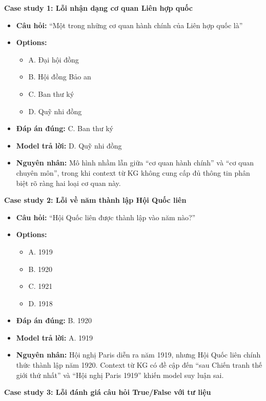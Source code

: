 \textbf{Case study 1: Lỗi nhận dạng cơ quan Liên hợp quốc}

\begin{itemize}
    \item \textbf{Câu hỏi:} ``Một trong những cơ quan hành chính của Liên hợp quốc là''
    \item \textbf{Options:} 
    \begin{itemize}
        \item A. Đại hội đồng
        \item B. Hội đồng Bảo an
        \item C. Ban thư ký
        \item D. Quỹ nhi đồng
    \end{itemize}
    \item \textbf{Đáp án đúng:} C. Ban thư ký
    \item \textbf{Model trả lời:} D. Quỹ nhi đồng
    \item \textbf{Nguyên nhân:} Mô hình nhầm lẫn giữa ``cơ quan hành chính'' và ``cơ quan chuyên môn'', trong khi context từ KG không cung cấp đủ thông tin phân biệt rõ ràng hai loại cơ quan này.
\end{itemize}

\textbf{Case study 2: Lỗi về năm thành lập Hội Quốc liên}

\begin{itemize}
    \item \textbf{Câu hỏi:} ``Hội Quốc liên được thành lập vào năm nào?''
    \item \textbf{Options:}
    \begin{itemize}
        \item A. 1919
        \item B. 1920
        \item C. 1921
        \item D. 1918
    \end{itemize}
    \item \textbf{Đáp án đúng:} B. 1920
    \item \textbf{Model trả lời:} A. 1919
    \item \textbf{Nguyên nhân:} Hội nghị Paris diễn ra năm 1919, nhưng Hội Quốc liên chính thức thành lập năm 1920. Context từ KG có đề cập đến ``sau Chiến tranh thế giới thứ nhất'' và ``Hội nghị Paris 1919'' khiến model suy luận sai.
\end{itemize}

\textbf{Case study 3: Lỗi đánh giá câu hỏi True/False với tư liệu}

